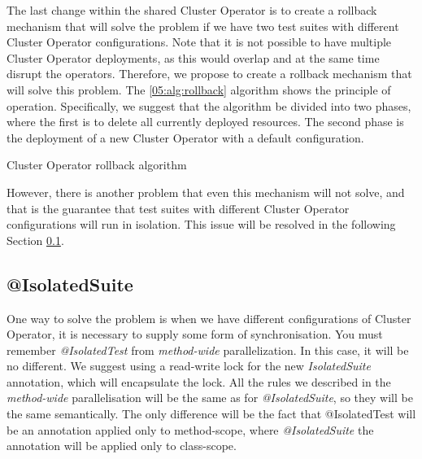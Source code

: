 The last change within the shared Cluster Operator is to create a rollback mechanism that will solve the problem if we have two test suites with different Cluster Operator configurations. Note that it is not possible to have multiple Cluster Operator deployments, as this would overlap and at the same time disrupt the operators. Therefore, we propose to create a rollback mechanism that will solve this problem. The \ref{05:alg:rollback} algorithm shows the principle of operation. Specifically, we suggest that the algorithm be divided into two phases, where the first is to delete all currently deployed resources. The second phase is the deployment of a new Cluster Operator with a default configuration.
\begin{algorithm}[H]
    \label{05:alg:rollback}
    \caption{Cluster Operator rollback algorithm}
    \begin{algorithmic}[1]
        \EndIf
        \EndIf
        \EndIf

        \State
    \end{algorithmic}
\end{algorithm}

However, there is another problem that even this mechanism will not solve, and that is the guarantee that test suites with different Cluster Operator configurations will run in isolation. This issue will be resolved in the following Section \ref{05:isolatedsuite}.

\subsection{@IsolatedSuite}
\label{05:isolatedsuite}

One way to solve the problem is when we have different configurations of Cluster Operator, it is necessary to supply some form of synchronisation. You must remember \emph{@IsolatedTest} from \emph{method-wide} parallelization. In this case, it will be no different. We suggest using a read-write lock for the new \emph{IsolatedSuite} annotation, which will encapsulate the lock. All the rules we described in the \emph{method-wide} parallelisation will be the same as for \emph{@IsolatedSuite}, so they will be the same semantically. The only difference will be the fact that @IsolatedTest will be an annotation applied only to method-scope, where \emph{@IsolatedSuite} the annotation will be applied only to class-scope.


